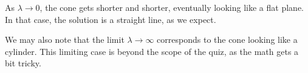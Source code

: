 \documentclass{article}
\newcommand{\purple}[1]{{\color{purple} #1}}
\begin{document}
\begin{itemize}
    \purple{
    As $\lambda \rightarrow 0$, the cone gets shorter and shorter, eventually looking like a flat plane. In that case, the solution is a straight line, as we expect.
    
    We may also note that the limit $\lambda \rightarrow \infty$ corresponds to the cone looking like a cylinder. This limiting case is beyond the scope of the quiz, as the math gets a bit tricky.
    }



\end{itemize}
\end{document}
